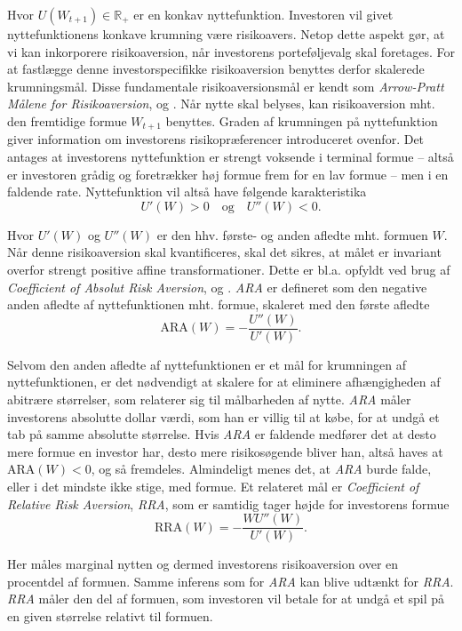 \documentclass[
  a4paper,
  oneside]{memoir}
\begin{document}
Hvor \(U(W_{t+1})\in\mathbb{R}_+\) er en konkav nyttefunktion. Investoren vil givet nyttefunktionens konkave krumning være risikoavers. Netop dette aspekt gør, at vi kan inkorporere risikoaversion, når investorens porteføljevalg skal foretages. For at fastlægge denne investorspecifikke risikoaversion benyttes derfor skalerede krumningsmål. Disse fundamentale risikoaversionsmål er kendt som \emph{Arrow-Pratt Målene for Risikoaversion}, \citep{Arrow1965} og \citep{Pratt1964}. Når nytte skal belyses, kan risikoaversion mht. den fremtidige formue \(W_{t+1}\) benyttes. Graden af krumningen på nyttefunktion giver information om investorens risikopræferencer introduceret ovenfor. Det antages at investorens nyttefunktion er strengt voksende i terminal formue -- altså er investoren grådig og foretrækker høj formue frem for en lav formue -- men i en faldende rate. Nyttefunktion vil altså have følgende karakteristika
\[U'(W)>0\quad\text{og}\quad U''(W)<0.\]

Hvor \(U'(W)\) og \(U''(W)\) er den hhv. første- og anden afledte mht. formuen \(W\). Når denne risikoaversion skal kvantificeres, skal det sikres, at målet er invariant overfor strengt positive affine transformationer. Dette er bl.a. opfyldt ved brug af \emph{Coefficient of Absolut Risk Aversion}, \citep{Arrow1965} og \citep{Pratt1964}. \emph{ARA} er defineret som den negative anden afledte af nyttefunktionen mht. formue, skaleret med den første afledte
\[\text{ARA}(W)=-\frac{U''(W)}{U'(W)}.\]

Selvom den anden afledte af nyttefunktionen er et mål for krumningen af nyttefunktionen, er det nødvendigt at skalere for at eliminere afhængigheden af abitrære størrelser, som relaterer sig til målbarheden af nytte. \emph{ARA} måler investorens absolutte dollar værdi, som han er villig til at købe, for at undgå et tab på samme absolutte størrelse. Hvis \emph{ARA} er faldende medfører det at desto mere formue en investor har, desto mere risikosøgende bliver han, altså haves at \(\text{ARA}(W)<0\), og så fremdeles. Almindeligt menes det, at \emph{ARA} burde falde, eller i det mindste ikke stige, med formue. Et relateret mål er \emph{Coefficient of Relative Risk Aversion}, \emph{RRA}, som er samtidig tager højde for investorens formue
\[\text{RRA}(W)=-\frac{WU''(W)}{U'(W)}.\]

Her måles marginal nytten og dermed investorens risikoaversion over en procentdel af formuen. Samme inferens som for \emph{ARA} kan blive udtænkt for \emph{RRA}. \emph{RRA} måler den del af formuen, som investoren vil betale for at undgå et spil på en given størrelse relativt til formuen.
\end{document}
